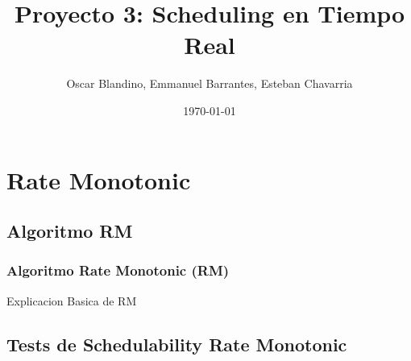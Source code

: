 \documentclass[xcolor=table]{beamer}
\title[Proyecto 3]{Proyecto 3: Scheduling en Tiempo Real} %
\author{Oscar Blandino, Emmanuel Barrantes, Esteban Chavarria} %
\institute[TEC] %
{
Tecnologico de Costa Rica \\ %
Sistemas Operativos Avanzados \\
I Semestre - 2018
\medskip
\textit{} %
}
\date{\today} %
\begin{document}
\begin{frame}
\titlepage %
\end{frame}



\section{Rate Monotonic}

\subsection{Algoritmo RM}

\begin{frame} 
\frametitle{Algoritmo Rate Monotonic (RM)} 
Explicacion Basica de RM \\
\end{frame}

\subsection{Tests de Schedulability  Rate Monotonic } 
\end{document}
